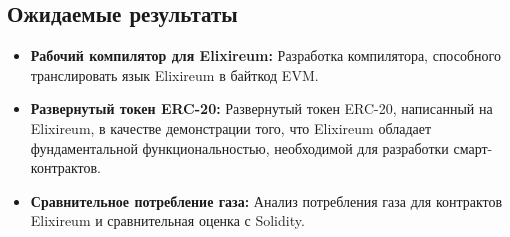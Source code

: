 \subsection{Ожидаемые результаты}
\begin{itemize}
  \item \textbf{Рабочий компилятор для Elixireum:} Разработка компилятора, способного транслировать язык Elixireum в байткод EVM.
  
  \item \textbf{Развернутый токен ERC-20:} Развернутый токен ERC-20, написанный на Elixireum, в качестве демонстрации того, что Elixireum обладает фундаментальной функциональностью, необходимой для разработки смарт-контрактов.
  
  \item \textbf{Сравнительное потребление газа:} Анализ потребления газа для контрактов Elixireum и сравнительная оценка с Solidity.
\end{itemize}